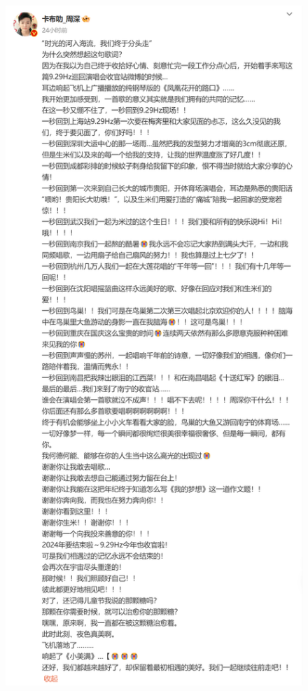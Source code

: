 \documentclass[]{ctexbook}
\begin{document}
\begin{figure}

{\centering \includegraphics{img/weibo/nanning-20241207} 

}

\end{figure}
\end{document}
